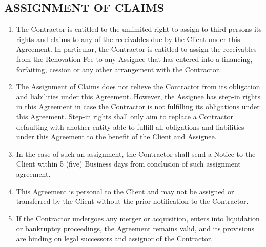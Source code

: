 \begin{multicols}{2}
\subsection{ASSIGNMENT OF CLAIMS}
\begin{enumerate}
	\item	The Contractor is entitled to the unlimited right to assign to third persons its rights and claims to any of the receivables due by the Client under this Agreement. In particular, the Contractor is entitled to assign the receivables from the Renovation Fee to any Assignee that has entered into a financing, forfaiting, cession or any other arrangement with the Contractor.
	\item	The Assignment of Claims does not relieve the Contractor from its obligation and liabilities under this Agreement. However, the Assignee has step-in rights in this Agreement in case the Contractor is not fulfilling its obligations under this Agreement. Step-in rights shall only aim to replace a Contractor defaulting with another entity able to fulfill all obligations and liabilities under this Agreement to the benefit of the Client and Assignee.
	\item	In the case of such an assignment, the Contractor shall send a Notice to the Client within 5 (five) Business days from conclusion of such assignment agreement.
	\item	This Agreement is personal to the Client and may not be assigned or transferred by the Client without the prior notification to the Contractor.
	\item	If the Contractor undergoes any merger or acquisition, enters into liquidation or bankruptcy proceedings, the Agreement remains valid, and its provisions are binding on legal successors and assignor of the Contractor.
\end{enumerate}


\end{multicols}
